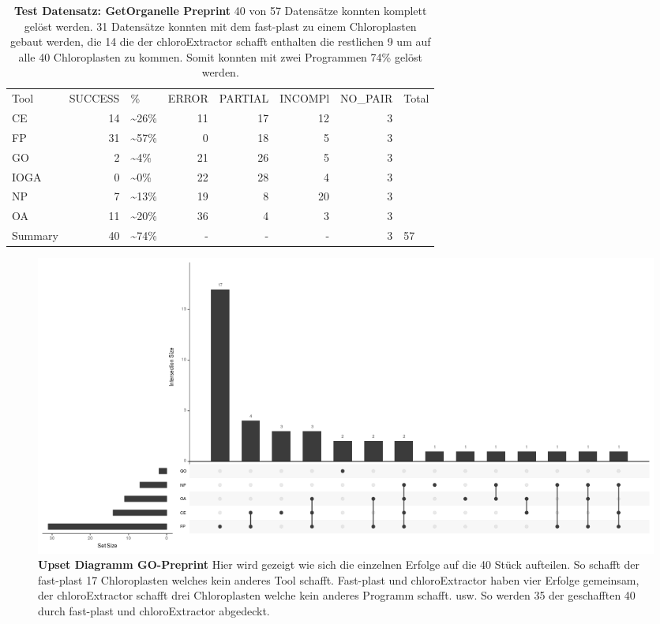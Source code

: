 \documentclass{scrartcl}
\begin{document}
\begin{table}[!h]
\caption[Test Datensatz: GetOrganelle Preprint, 11 Datensätze]{\textbf{Test Datensatz: GetOrganelle Preprint} 40 von 57 Datensätze konnten komplett gelöst werden. 31 Datensätze konnten mit dem fast-plast zu einem Chloroplasten gebaut werden, die 14 die der chloroExtractor schafft enthalten die restlichen 9 um auf alle 40 Chloroplasten zu kommen. Somit konnten mit zwei Programmen 74\% gelöst werden.}
\begin{center}
\begin{tabular}{lrlrrrrl}
Tool & SUCCESS & \% & ERROR & PARTIAL & INCOMPl & NO\_PAIR & Total\\
CE & 14 & \textasciitilde{}26\% & 11 & 17 & 12 & 3 & \\
FP & 31 & \textasciitilde{}57\% & 0 & 18 & 5 & 3 & \\
GO & 2 & \textasciitilde{}4\% & 21 & 26 & 5 & 3 & \\
IOGA & 0 & \textasciitilde{}0\% & 22 & 28 & 4 & 3 & \\
NP & 7 & \textasciitilde{}13\% & 19 & 8 & 20 & 3 & \\
OA & 11 & \textasciitilde{}20\% & 36 & 4 & 3 & 3 & \\
Summary & 40 & \textasciitilde{}74\% & - & - & - & 3 & 57\\
\end{tabular}
\end{center}

\end{table}

\begin{figure}
\includegraphics[width=.9\linewidth]{./upset.png}
\caption[Upset Diagramm GO-Preprint]{\textbf{Upset Diagramm GO-Preprint} Hier wird gezeigt wie sich die einzelnen Erfolge auf die 40 Stück aufteilen. So schafft der fast-plast 17 Chloroplasten welches kein anderes Tool schafft. Fast-plast und chloroExtractor haben vier Erfolge gemeinsam, der chloroExtractor schafft drei Chloroplasten welche kein anderes Programm schafft. usw. So werden 35 der geschafften 40 durch fast-plast und chloroExtractor abgedeckt.}
\end{figure}
\end{document}
